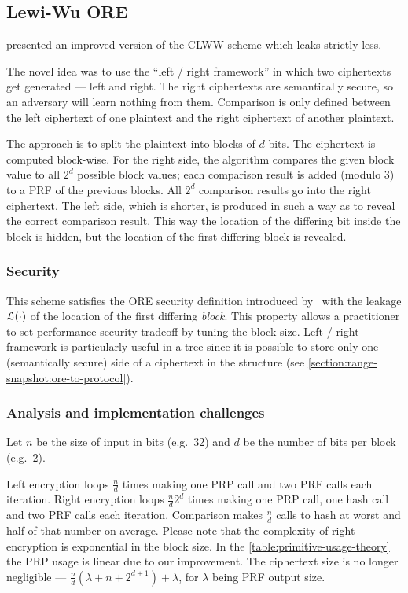 \subsection{Lewi-Wu ORE}

	\textcite{lewi-wu-ore} presented an improved version of the CLWW scheme \cite{clww-ore} which leaks strictly less.

	The novel idea was to use the ``left / right framework'' in which two ciphertexts get generated --- left and right.
	The right ciphertexts are semantically secure, so an adversary will learn nothing from them.
	Comparison is only defined between the left ciphertext of one plaintext and the right ciphertext of another plaintext.

	The approach is to split the plaintext into blocks of $d$ bits.
	The ciphertext is computed block-wise.
	For the right side, the algorithm compares the given block value to all $2^d$ possible block values; each comparison result is added (modulo 3) to a PRF of the previous blocks.
	All $2^d$ comparison results go into the right ciphertext.
	The left side, which is shorter, is produced in such a way as to reveal the correct comparison result.
	This way the location of the differing bit inside the block is hidden, but the location of the first differing block is revealed.

	\subsubsection{Security}
		This scheme satisfies the ORE security definition introduced by~\textcite{clww-ore} with the leakage $\mathcal{L}(\cdot)$ of the location of the first differing \emph{block}.
		This property allows a practitioner to set performance-security tradeoff by tuning the block size.
		Left / right framework is particularly useful in a {\BPlus} tree since it is possible to store only one (semantically secure) side of a ciphertext in the structure (see \cref{section:range-snapshot:ore-to-protocol}).

	\subsubsection{Analysis and implementation challenges}

		Let $n$ be the size of input in bits (e.g.\ 32) and $d$ be the number of bits per block (e.g.\ 2).

		Left encryption loops $\frac{n}{d}$ times making one PRP call and two PRF calls each iteration.
		Right encryption loops $\frac{n}{d} 2^d$ times making one PRP call, one hash call and two PRF calls each iteration.
		Comparison makes $\frac{n}{d}$ calls to hash at worst and half of that number on average.
		Please note that the complexity of right encryption is exponential in the block size.
		In the \cref{table:primitive-usage-theory} the PRP usage is linear due to our improvement.
		The ciphertext size is no longer negligible --- $\frac{n}{d} \left(\lambda + n + 2^{d + 1} \right) + \lambda$, for $\lambda$ being PRF output size.

